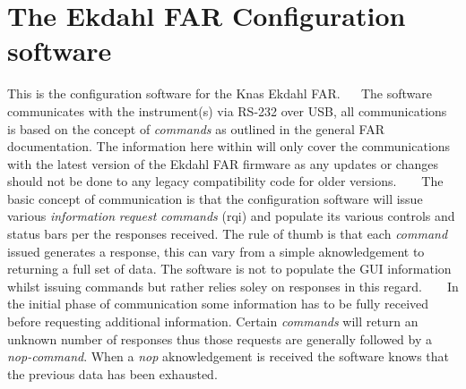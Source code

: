 \chapter{The Ekdahl FAR Configuration software}
\hypertarget{index}{}\label{index}
This is the configuration software for the Knas Ekdahl FAR.~\newline
~\newline
 The software communicates with the instrument(s) via RS-\/232 over USB, all communications is based on the concept of {\itshape commands} as outlined in the general FAR documentation. The information here within will only cover the communications with the latest version of the Ekdahl FAR firmware as any updates or changes should not be done to any legacy compatibility code for older versions. ~\newline
 ~\newline
 The basic concept of communication is that the configuration software will issue various {\itshape information} {\itshape request} {\itshape commands} (\textquotesingle{}rqi\textquotesingle{}) and populate its various controls and status bars per the responses received. The rule of thumb is that each {\itshape command} issued generates a response, this can vary from a simple aknowledgement to returning a full set of data. The software is not to populate the GUI information whilst issuing commands but rather relies soley on responses in this regard. ~\newline
 ~\newline
 In the initial phase of communication some information has to be fully received before requesting additional information. Certain {\itshape commands} will return an unknown number of responses thus those requests are generally followed by a {\itshape \textquotesingle{}nop\textquotesingle{}-\/command}. When a {\itshape \textquotesingle{}nop\textquotesingle{}} aknowledgement is received the software knows that the previous data has been exhausted.

